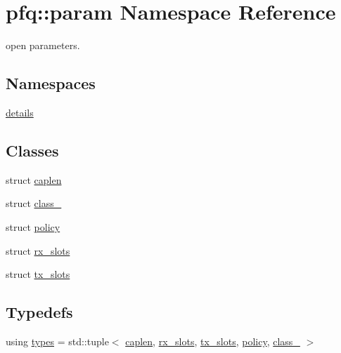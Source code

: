 \hypertarget{namespacepfq_1_1param}{\section{pfq\+:\+:param Namespace Reference}
\label{namespacepfq_1_1param}
}


open parameters.  


\subsection*{Namespaces}
\begin{DoxyCompactItemize}
\item 
 \hyperlink{namespacepfq_1_1param_1_1details}{details}
\end{DoxyCompactItemize}
\subsection*{Classes}
\begin{DoxyCompactItemize}
\item 
struct \hyperlink{structpfq_1_1param_1_1caplen}{caplen}
\item 
struct \hyperlink{structpfq_1_1param_1_1class__}{class\+\_\+}
\item 
struct \hyperlink{structpfq_1_1param_1_1policy}{policy}
\item 
struct \hyperlink{structpfq_1_1param_1_1rx__slots}{rx\+\_\+slots}
\item 
struct \hyperlink{structpfq_1_1param_1_1tx__slots}{tx\+\_\+slots}
\end{DoxyCompactItemize}
\subsection*{Typedefs}
\begin{DoxyCompactItemize}
\item 
using \hyperlink{namespacepfq_1_1param_a287394f9fea16ebb76e770334aedd2d5}{types} = std\+::tuple$<$ \hyperlink{structpfq_1_1param_1_1caplen}{caplen}, \hyperlink{structpfq_1_1param_1_1rx__slots}{rx\+\_\+slots}, \hyperlink{structpfq_1_1param_1_1tx__slots}{tx\+\_\+slots}, \hyperlink{structpfq_1_1param_1_1policy}{policy}, \hyperlink{structpfq_1_1param_1_1class__}{class\+\_\+} $>$
\end{DoxyCompactItemize}

